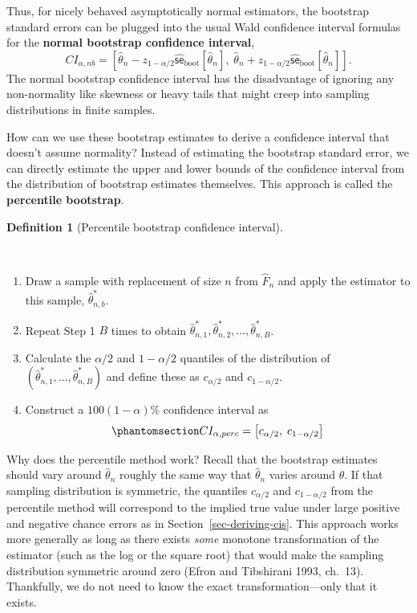 \documentclass[
  13pt,
  letterpaper,
  DIV=11,
  numbers=noendperiod]{scrreprt}
\newcommand{\se}{\textsf{se}}
\theoremstyle{plain}
\theoremstyle{plain}
\theoremstyle{definition}
\newtheorem{definition}{Definition}[chapter]
\theoremstyle{definition}
\theoremstyle{remark}
\begin{document}
Thus, for nicely behaved asymptotically normal estimators, the bootstrap
standard errors can be plugged into the usual Wald confidence interval
formulas for the \textbf{normal bootstrap confidence interval}, \[
CI_{\alpha, nb} = \left[\widehat{\theta}_n - z_{1-\alpha/2}\widehat{\se}_{\text{boot}}[\widehat{\theta}_n],\; \widehat{\theta}_{n} + z_{1-\alpha/2}\widehat{\se}_{\text{boot}}[\widehat{\theta}_n]\right].
\] The normal bootstrap confidence interval has the disadvantage of
ignoring any non-normality like skewness or heavy tails that might creep
into sampling distributions in finite samples.

How can we use these bootstrap estimates to derive a confidence interval
that doesn't assume normality? Instead of estimating the bootstrap
standard error, we can directly estimate the upper and lower bounds of
the confidence interval from the distribution of bootstrap estimates
themselves. This approach is called the \textbf{percentile bootstrap}.

\begin{definition}[Percentile bootstrap confidence
interval]\protect\hypertarget{def-percentile-bootstrap}{}\label{def-percentile-bootstrap}

~

\begin{enumerate}
\def\labelenumi{\arabic{enumi}.}
\item
  Draw a sample with replacement of size \(n\) from \(\widehat{F}_n\)
  and apply the estimator to this sample, \(\widehat{\theta}^*_{n,b}\).
\item
  Repeat Step 1 \(B\) times to obtain
  \(\widehat{\theta}^*_{n,1}, \widehat{\theta}^*_{n,2}, \ldots, \widehat{\theta}^*_{n,B}\).
\item
  Calculate the \(\alpha/2\) and \(1-\alpha/2\) quantiles of the
  distribution of
  \((\widehat{\theta}^*_{n,1}, \ldots, \widehat{\theta}^*_{n,B})\) and
  define these as \(c_{\alpha/2}\) and \(c_{1-\alpha/2}\).
\item
  Construct a \(100(1-\alpha)\%\) confidence interval as
  \begin{equation}\protect\phantomsection\label{eq-perc-bootstrap-cis}{
  CI_{\alpha, perc} = \left[c_{\alpha/2},\; c_{1-\alpha/2}\right]
  }\end{equation}
\end{enumerate}

\end{definition}

Why does the percentile method work? Recall that the bootstrap estimates
should vary around \(\widehat{\theta}_n\) roughly the same way that
\(\widehat{\theta}_n\) varies around \(\theta\). If that sampling
distribution is symmetric, the quantiles \(c_{\alpha/2}\) and
\(c_{1-\alpha/2}\) from the percentile method will correspond to the
implied true value under large positive and negative chance errors as in
Section~\ref{sec-deriving-cis}. This approach works more generally as
long as there exists \emph{some} monotone transformation of the
estimator (such as the log or the square root) that would make the
sampling distribution symmetric around zero (Efron and Tibshirani 1993,
ch.~13). Thankfully, we do not need to know the exact
transformation---only that it exists.
\end{document}
